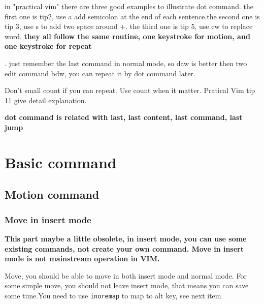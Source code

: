 \documentclass[paper=8.5in:11in, twoside, 12pt, pagesize=pdftex]{book}
\begin{document}
in "practical vim" there are three good examples to illustrate dot command. the first one is tip2, use a add semicolon at the end of each sentence.the second one is tip 3, use s to add two space around +. the third one is tip 5, use cw to replace word. \textbf{they all follow the same routine, one keystroke for motion, and one keystroke for repeat}

. just remember the last command in normal mode, so daw is better then two edit command bdw, you can repeat it by dot command later.

Don't small count if you can repeat. Use count when it matter. Pratical Vim tip 11 give detail explanation. 	

\textbf{dot command is related with last, last content, last command, last jump}

	
\section{Basic command}
\subsection{Motion command}
\subsubsection{Move in insert mode}
	
	\textbf{This part maybe a little obsolete, in insert mode, you can use some existing commands, not create your own command. Move in insert mode is not mainstream operation in VIM.}
	
	Move, you should be able to move in both insert mode and normal mode. For some simple move, you should not leave insert mode, that means you can save some time.You need to use \verb!inoremap! to map to alt key, see next item.  
	
\end{document}
